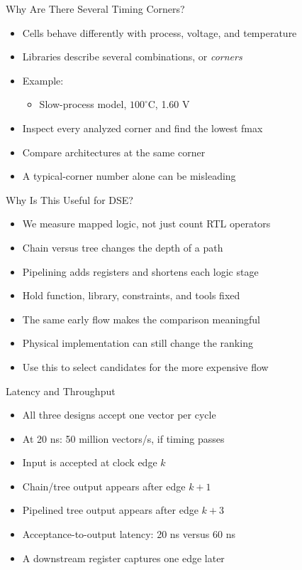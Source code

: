 \begin{frame}{Why Are There Several Timing Corners?}
\begin{itemize}
\item Cells behave differently with process, voltage,
      and temperature
\item Libraries describe several combinations, or \emph{corners}
\item Example: 
\begin{itemize}
\item Slow-process model, $100^\circ$C, 1.60 V
\end{itemize}
\item Inspect every analyzed corner and find the lowest fmax
\item Compare architectures at the same corner
\item A typical-corner number alone can be misleading
\end{itemize}
\end{frame}

\begin{frame}{Why Is This Useful for DSE?}
\begin{itemize}
\item We measure mapped logic, not just count RTL operators
\item Chain versus tree changes the depth of a path
\item Pipelining adds registers and shortens each logic stage
\item Hold function, library, constraints, and tools fixed
\item The same early flow makes the comparison meaningful
\item Physical implementation can still change the ranking
\item Use this to select candidates for the more expensive flow
\end{itemize}
\end{frame}


\begin{frame}{Latency and Throughput}
\begin{itemize}
\item All three designs accept one vector per cycle
\item At 20 ns: 50 million vectors/s, if timing passes
\item Input is accepted at clock edge $k$
\item Chain/tree output appears after edge $k+1$
\item Pipelined tree output appears after edge $k+3$
\item Acceptance-to-output latency: 20 ns versus 60 ns
\item A downstream register captures one edge later
\end{itemize}
\end{frame}




